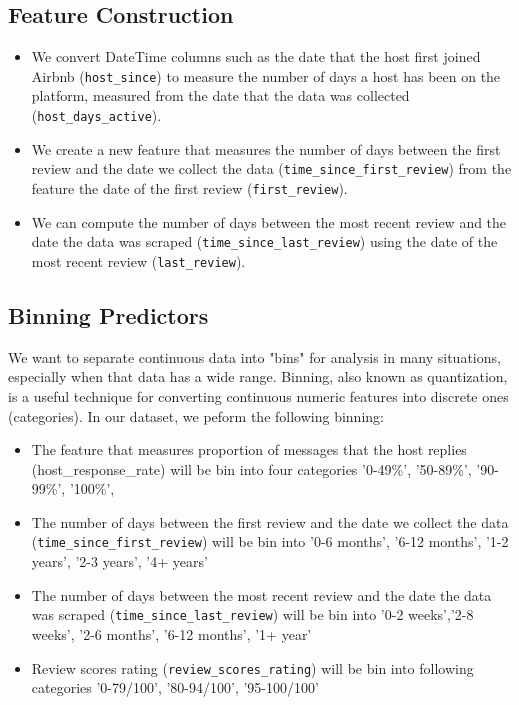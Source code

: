 \subsection{Feature Construction}

\begin{itemize}

    \item We convert DateTime columns such as the date that the host first joined Airbnb
        (\texttt{host\_since}) to measure the number of days a host has been on
        the platform, measured from the date that the data was collected
        (\texttt{host\_days\_active}).

    \item We create a new feature that measures the number of days between the first
        review and  the date we collect the data
        (\texttt{time\_since\_first\_review}) from
        the feature the date of the first review (\texttt{first\_review}).

    \item We can compute the number of days between the most recent review and
        the date the data was scraped (\texttt{time\_since\_last\_review}) using the date of the
        most recent review (\texttt{last\_review}).
\end{itemize}

\subsection{Binning Predictors}

We want to separate continuous data into "bins" for analysis in many situations, especially when that data has a wide range.
Binning, also known as quantization, is a useful technique for converting continuous numeric features into discrete ones (categories).
In our dataset, we peform the following binning:
\begin{itemize}

    \item The feature that measures proportion of messages that the host replies
(host\_response\_rate) will be bin into four categories '0-49\%', '50-89\%',
'90-99\%', '100\%',

    \item The number of days between the first review and the date we collect the data
        (\texttt{time\_since\_first\_review}) will be bin into '0-6 months', '6-12 months', '1-2
    years', '2-3 years', '4+ years'

    \item The number of days between the most recent review and the date the data was
        scraped (\texttt{time\_since\_last\_review}) will be bin into '0-2 weeks','2-8 weeks',
    '2-6 months', '6-12 months', '1+ year'

    \item Review scores rating (\texttt{review\_scores\_rating}) will be bin into following
        categories '0-79/100', '80-94/100', '95-100/100'
\end{itemize}



